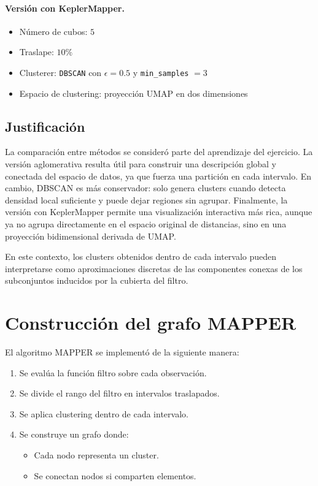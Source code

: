 \documentclass[12pt]{article}
\begin{document}
\paragraph{Versi\'on con KeplerMapper.}
\begin{itemize}
    \item N\'umero de cubos: $5$
    \item Traslape: $10\%$
    \item Clusterer: \texttt{DBSCAN} con $\epsilon = 0.5$ y \texttt{min\_samples} $= 3$
    \item Espacio de clustering: proyecci\'on UMAP en dos dimensiones
\end{itemize}

\subsection{Justificaci\'on}

La comparaci\'on entre m\'etodos se consider\'o parte del aprendizaje del ejercicio. La versi\'on aglomerativa resulta \'util para construir una descripci\'on global y conectada del espacio de datos, ya que fuerza una partici\'on en cada intervalo. En cambio, DBSCAN es m\'as conservador: solo genera clusters cuando detecta densidad local suficiente y puede dejar regiones sin agrupar. Finalmente, la versi\'on con KeplerMapper permite una visualizaci\'on interactiva m\'as rica, aunque ya no agrupa directamente en el espacio original de distancias, sino en una proyecci\'on bidimensional derivada de UMAP.

En este contexto, los clusters obtenidos dentro de cada intervalo pueden interpretarse como aproximaciones discretas de las componentes conexas de los subconjuntos inducidos por la cubierta del filtro.

\section{Construcci\'on del grafo MAPPER}

El algoritmo MAPPER se implement\'o de la siguiente manera:

\begin{enumerate}
    \item Se eval\'ua la funci\'on filtro sobre cada observaci\'on.
    \item Se divide el rango del filtro en intervalos traslapados.
    \item Se aplica clustering dentro de cada intervalo.
    \item Se construye un grafo donde:
    \begin{itemize}
        \item Cada nodo representa un cluster.
        \item Se conectan nodos si comparten elementos.
    \end{itemize}
\end{enumerate}
\end{document}
